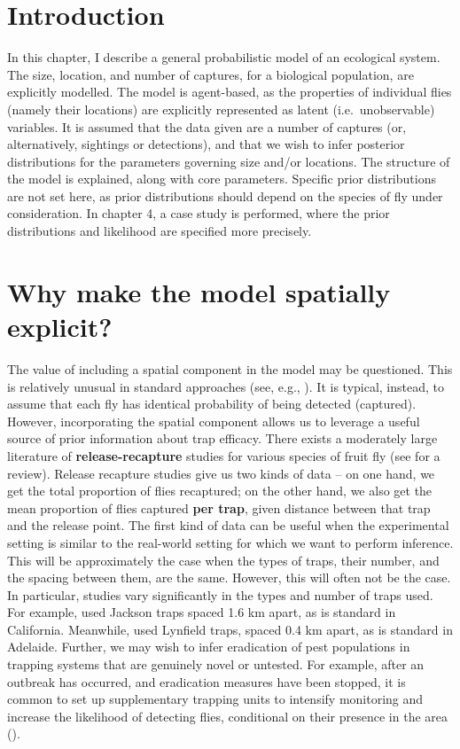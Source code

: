 \documentclass[
  oneside]{book}
\begin{document}
\hypertarget{introduction-2}{%
\section{Introduction}\label{introduction-2}}

In this chapter, I describe a general probabilistic model of an ecological system. The size, location, and number of captures, for a biological population, are explicitly modelled. The model is agent-based, as the properties of individual flies (namely their locations) are explicitly represented as latent (i.e.~unobservable) variables. It is assumed that the data given are a number of captures (or, alternatively, sightings or detections), and that we wish to infer posterior distributions for the parameters governing size and/or locations. The structure of the model is explained, along with core parameters. Specific prior distributions are not set here, as prior distributions should depend on the species of fly under consideration. In chapter 4, a case study is performed, where the prior distributions and likelihood are specified more precisely.

\hypertarget{why-make-the-model-spatially-explicit}{%
\section{Why make the model spatially explicit?}\label{why-make-the-model-spatially-explicit}}

The value of including a spatial component in the model may be questioned. This is relatively unusual in standard approaches (see, e.g., \citet{mcardle1990}). It is typical, instead, to assume that each fly has identical probability of being detected (captured). However, incorporating the spatial component allows us to leverage a useful source of prior information about trap efficacy. There exists a moderately large literature of \textbf{release-recapture} studies for various species of fruit fly (see \citet{andress2013} for a review). Release recapture studies give us two kinds of data -- on one hand, we get the total proportion of flies recaptured; on the other hand, we also get the mean proportion of flies captured \textbf{per trap}, given distance between that trap and the release point. The first kind of data can be useful when the experimental setting is similar to the real-world setting for which we want to perform inference. This will be approximately the case when the types of traps, their number, and the spacing between them, are the same. However, this will often not be the case. In particular, studies vary significantly in the types and number of traps used. For example, \citet{lance1994} used Jackson traps spaced 1.6 km apart, as is standard in California. Meanwhile, \citet{ms2007} used Lynfield traps, spaced 0.4 km apart, as is standard in Adelaide. Further, we may wish to infer eradication of pest populations in trapping systems that are genuinely novel or untested. For example, after an outbreak has occurred, and eradication measures have been stopped, it is common to set up supplementary trapping units to intensify monitoring and increase the likelihood of detecting flies, conditional on their presence in the area (\citet{supptraps}).
\end{document}

